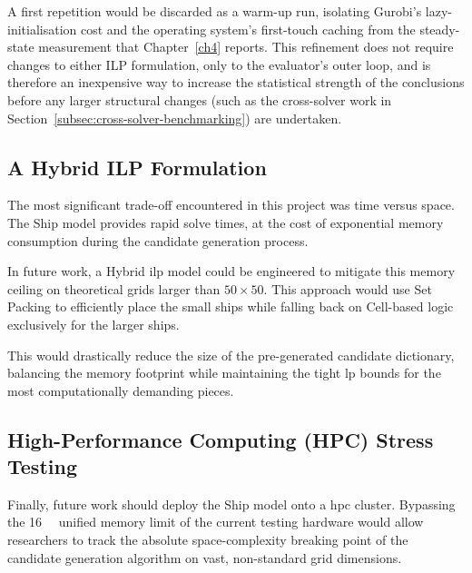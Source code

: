 A first repetition would be discarded as a warm-up run, isolating Gurobi's lazy-initialisation cost and the operating system's first-touch caching from the steady-state measurement that Chapter~\ref{ch4} reports. This refinement does not require changes to either ILP formulation, only to the evaluator's outer loop, and is therefore an inexpensive way to increase the statistical strength of the conclusions before any larger structural changes (such as the cross-solver work in Section~\ref{subsec:cross-solver-benchmarking}) are undertaken.

\subsection{A Hybrid ILP Formulation}\label{subsec:hybrid-ilp-formulation}
The most significant trade-off encountered in this project was time versus space. The Ship model provides rapid solve times, at the cost of exponential memory consumption during the candidate generation process.

In future work, a Hybrid \gls{ilp} model could be engineered to mitigate this memory ceiling on theoretical grids larger than $50 \times 50$. This approach would use Set Packing to efficiently place the small ships while falling back on Cell-based logic exclusively for the larger ships. 

This would drastically reduce the size of the pre-generated candidate dictionary, balancing the memory footprint while maintaining the tight \gls{lp} bounds for the most computationally demanding pieces.

\subsection{High-Performance Computing (HPC) Stress Testing}\label{high-performance-computing-testing}
Finally, future work should deploy the Ship model onto a \gls{hpc} cluster. Bypassing the \SI{16}{\giga\byte} unified memory limit of the current testing hardware would allow researchers to track the absolute space-complexity breaking point of the candidate generation algorithm on vast, non-standard grid dimensions.
